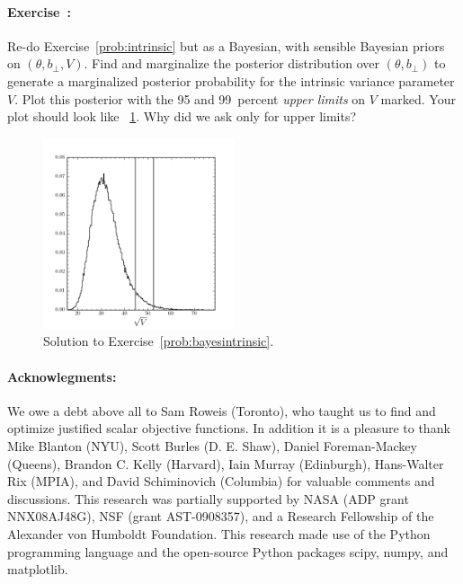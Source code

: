 \documentclass[12pt,twoside]{article}
\newcommand{\problemname}{Exercise}
\newcounter{problem}
\newenvironment{problem}{\paragraph{\problemname~\theproblem:}\refstepcounter{problem}}{}
\newcommand{\bperp}{b_{\perp}}
\begin{document}
\begin{problem}\label{prob:bayesintrinsic}
Re-do \problemname~\ref{prob:intrinsic} but as a Bayesian, with
sensible Bayesian priors on $(\theta,\bperp,V)$.  Find and marginalize
the posterior distribution over $(\theta,\bperp)$ to generate a
marginalized posterior probability for the intrinsic variance
parameter $V$.  Plot this posterior with the 95 and 99~percent
\emph{upper limits} on $V$ marked.  Your plot should look like
\figurename~\ref{fig:bayesintrinsic}.  Why did we ask only for upper
limits?
\end{problem}

\begin{figure}[htbp]
\includegraphics[width=0.5\textwidth]{ex17.png}
\caption{Solution to \problemname~\ref{prob:bayesintrinsic}.}\label{fig:bayesintrinsic}
\end{figure}

\theendnotes

\paragraph{Acknowlegments:}
We owe a debt above all to Sam Roweis (Toronto), who taught us to find
and optimize justified scalar objective functions.  In addition it is
a pleasure to thank Mike Blanton (NYU), Scott Burles (D. E. Shaw),
Daniel Foreman-Mackey (Queens), Brandon C. Kelly (Harvard), Iain
Murray (Edinburgh), Hans-Walter Rix (MPIA), and David Schiminovich
(Columbia) for valuable comments and discussions.  This research was
partially supported by NASA (ADP grant NNX08AJ48G), NSF (grant
AST-0908357), and a Research Fellowship of the Alexander von Humboldt
Foundation.  This research made use of the Python programming language
and the open-source Python packages scipy, numpy, and matplotlib.
\end{document}
